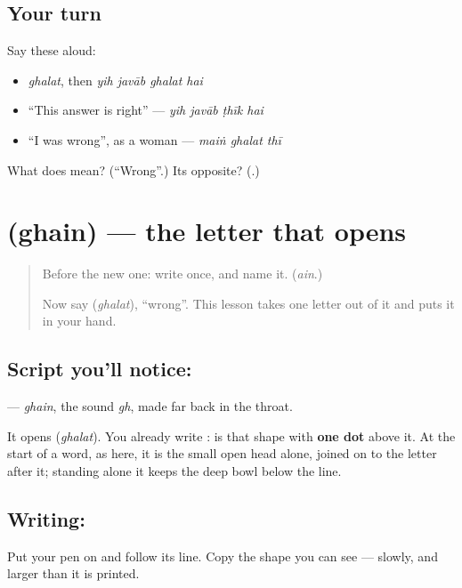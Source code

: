 \subsection*{Your turn}
Say these aloud:

\begin{itemize}
\raggedright
  \item \emph{ghalat}, then \emph{yih javāb ghalat hai}
  \item \textquotedblleft{}This answer is right\textquotedblright{} — \emph{yih javāb ṭhīk hai}
  \item \textquotedblleft{}I was wrong\textquotedblright{}, as a woman — \emph{maiṅ ghalat thī}
\end{itemize}

\begin{tcolorbox}[breakable,colback=teal!4,colframe=teal!35!black,title={Before you move on}]
What does \textbf{} mean? (\textquotedblleft{}Wrong\textquotedblright{}.) Its opposite? (\textbf{}.)
\end{tcolorbox}
\section[\texorpdfstring{\ur{غ} (ghain)}{غ (ghain)}]{ (ghain) — the letter that opens }

\label{lesson:UR-W268-ghain}



\begin{quote}
Before the new one: write  once, and name it. (\emph{ain}.)

Now say \textbf{} (\emph{ghalat}), \textquotedblleft{}wrong\textquotedblright{}. This lesson takes one letter out of it and puts it in your hand.
\end{quote}

\subsection*{Script you'll notice: }
\textbf{} — \emph{ghain}, the sound \emph{gh}, made far back in the throat.

It opens \textbf{} (\emph{ghalat}). You already write \textbf{}: \textbf{} is that shape with \textbf{one dot} above it. At the start of a word, as here, it is the small open head alone, joined on to the letter after it; standing alone it keeps the deep bowl below the line.

\subsection*{Writing: }
Put your pen on  and follow its line. Copy the shape you can see — slowly, and larger than it is printed.


